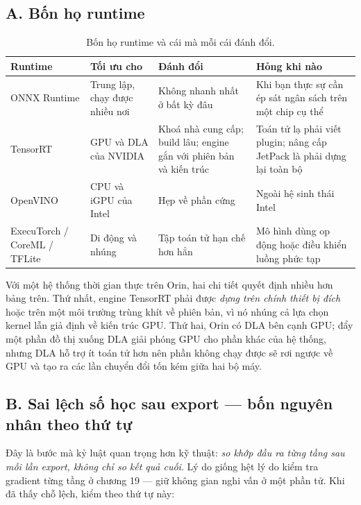 \documentclass[../../deep_learning.tex]{subfiles}
\begin{document}
\subsection{A. Bốn họ runtime}
\begin{table}[H]\centering\footnotesize
\caption{Bốn họ runtime và cái mà mỗi cái đánh đổi.}
\label{tab:runtime}
\begin{tabularx}{\linewidth}{@{}L{2.6cm}YYY@{}}
\toprule
\textbf{Runtime} & \textbf{Tối ưu cho} & \textbf{Đánh đổi} & \textbf{Hỏng khi nào}\\
\midrule
ONNX Runtime & Trung lập, chạy được nhiều nơi & Không nhanh nhất ở bất kỳ đâu & Khi bạn thực sự cần ép sát ngân sách trên một chip cụ thể\\
TensorRT & GPU và DLA của NVIDIA & Khoá nhà cung cấp; build lâu; engine gắn với phiên bản và kiến trúc & Toán tử lạ phải viết plugin; nâng cấp JetPack là phải dựng lại toàn bộ\\
OpenVINO & CPU và iGPU của Intel & Hẹp về phần cứng & Ngoài hệ sinh thái Intel\\
ExecuTorch / CoreML / TFLite & Di động và nhúng & Tập toán tử hạn chế hơn hẳn & Mô hình dùng op động hoặc điều khiển luồng phức tạp\\
\bottomrule
\end{tabularx}
\end{table}

Với một hệ thống thời gian thực trên Orin, hai chi tiết quyết định nhiều hơn bảng trên. Thứ nhất, engine TensorRT phải được \emph{dựng trên chính thiết bị đích} hoặc trên một môi trường trùng khít về phiên bản, vì nó nhúng cả lựa chọn kernel lẫn giả định về kiến trúc GPU. Thứ hai, Orin có DLA bên cạnh GPU; đẩy một phần đồ thị xuống DLA giải phóng GPU cho phần khác của hệ thống, nhưng DLA hỗ trợ ít toán tử hơn nên phần không chạy được sẽ rơi ngược về GPU và tạo ra các lần chuyển đổi tốn kém giữa hai bộ máy.

\subsection{B. Sai lệch số học sau export --- bốn nguyên nhân theo thứ tự}
Đây là bước mà kỷ luật quan trọng hơn kỹ thuật: \emph{so khớp đầu ra từng tầng sau mỗi lần export, không chỉ so kết quả cuối}. Lý do giống hệt lý do kiểm tra gradient từng tầng ở chương 19 --- giữ không gian nghi vấn ở một phần tử. Khi đã thấy chỗ lệch, kiểm theo thứ tự này:

\end{document}
